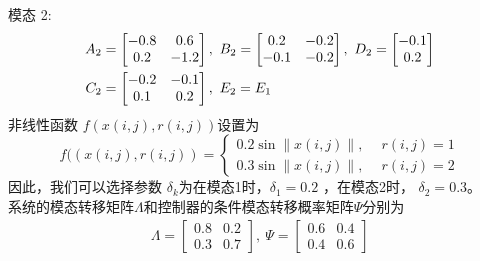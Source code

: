 	模态 2:
	\begin{equation} \notag
	\begin{aligned}
	A_{2} &=\begin{bmatrix}
	-0.8&0.6\\
	0.2&-1.2
	\end{bmatrix}, \ 
	B_{2} = \begin{bmatrix}
	0.2&-0.2\\ -0.1&-0.2
	\end{bmatrix} ,\ 
	D_{2} = \begin{bmatrix}
	-0.1\\0.2
	\end{bmatrix} \\
	C_{2} &= \begin{bmatrix}
	-0.2&-0.1\\0.1&0.2
	\end{bmatrix},\
	E_{2} = E_{1}
	\end{aligned}  
	\end{equation}
	非线性函数 $f(x(i,j),r(i,j))$设置为
	\begin{equation*}
	f((x(i,j),r(i,j)) = \begin{cases}
	0.2\sin{ \|x(i,j)\|}, \quad \ r(i,j)=1\\
	0.3\sin{ \|x(i,j)\|}, \quad \ r(i,j)=2
	\end{cases}
	\end{equation*}
	因此，我们可以选择参数 $\delta_{k}$为在模态1时，$\delta_{1}=0.2$ ，在模态2时， $\delta_{2}=0.3$。\\
	系统的模态转移矩阵$\varLambda$和控制器的条件模态转移概率矩阵$\varPsi$分别为 
	\begin{equation*}
	\begin{aligned}
	\varLambda=\begin{bmatrix}
	0.8&0.2\\ 0.3&0.7
	\end{bmatrix}, \ 
	\varPsi = \begin{bmatrix}
	0.6&0.4\\ 0.4 &0.6
	\end{bmatrix}
	\end{aligned}
	\end{equation*}
